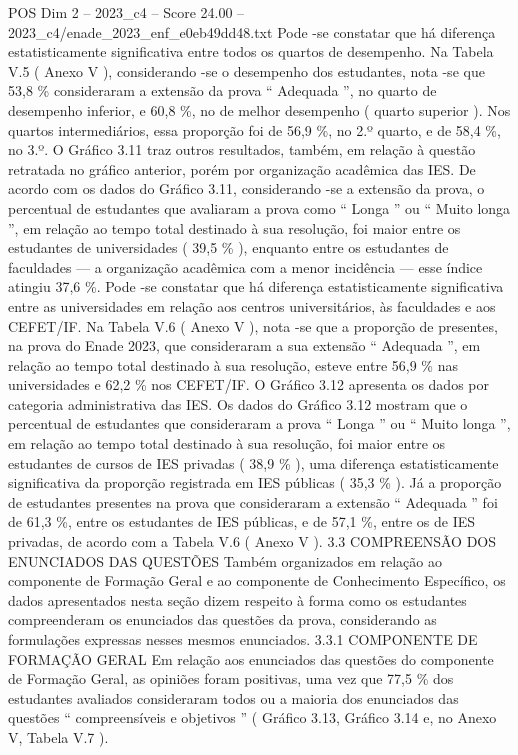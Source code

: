 \begin{textsample}{POS Dim 2 – 2023\_c4 – Score 24.00 – 2023\_c4/enade\_2023\_enf\_e0eb49dd48.txt}
Pode -se constatar que há diferença estatisticamente significativa entre todos os quartos de desempenho.
Na Tabela V.5 ( Anexo V ), considerando -se o desempenho dos estudantes, nota -se que 53,8 \% consideraram a extensão da prova “ Adequada ”, no quarto de desempenho inferior, e 60,8 \%, no de melhor desempenho ( quarto superior ).
Nos quartos intermediários, essa proporção foi de 56,9 \%, no 2.º quarto, e de 58,4 \%, no 3.º.
O Gráfico 3.11 traz outros resultados, também, em relação à questão retratada no gráfico anterior, porém por organização acadêmica das IES.
De acordo com os dados do Gráfico 3.11, considerando -se a extensão da prova, o percentual de estudantes que avaliaram a prova como “ Longa ” ou “ Muito longa ”, em relação ao tempo total destinado à sua resolução, foi maior entre os estudantes de universidades ( 39,5 \% ), enquanto entre os estudantes de faculdades — a organização acadêmica com a menor incidência — esse índice atingiu 37,6 \%.
Pode -se constatar que há diferença estatisticamente significativa entre as universidades em relação aos centros universitários, às faculdades e aos CEFET/IF.
Na Tabela V.6 ( Anexo V ), nota -se que a proporção de presentes, na prova do Enade 2023, que consideraram a sua extensão “ Adequada ”, em relação ao tempo total destinado à sua resolução, esteve entre 56,9 \% nas universidades e 62,2 \% nos CEFET/IF.
O Gráfico 3.12 apresenta os dados por categoria administrativa das IES.
Os dados do Gráfico 3.12 mostram que o percentual de estudantes que consideraram a prova “ Longa ” ou “ Muito longa ”, em relação ao tempo total destinado à sua resolução, foi maior entre os estudantes de cursos de IES privadas ( 38,9 \% ), uma diferença estatisticamente significativa da proporção registrada em IES públicas ( 35,3 \% ).
Já a proporção de estudantes presentes na prova que consideraram a extensão “ Adequada ” foi de 61,3 \%, entre os estudantes de IES públicas, e de 57,1 \%, entre os de IES privadas, de acordo com a Tabela V.6 ( Anexo V ). 3.3 COMPREENSÃO DOS ENUNCIADOS DAS QUESTÕES Também organizados em relação ao componente de Formação Geral e ao componente de Conhecimento Específico, os dados apresentados nesta seção dizem respeito à forma como os estudantes compreenderam os enunciados das questões da prova, considerando as formulações expressas nesses mesmos enunciados. 3.3.1 COMPONENTE DE FORMAÇÃO GERAL Em relação aos enunciados das questões do componente de Formação Geral, as opiniões foram positivas, uma vez que 77,5 \% dos estudantes avaliados consideraram todos ou a maioria dos enunciados das questões “ compreensíveis e objetivos ” ( Gráfico 3.13, Gráfico 3.14 e, no Anexo V, Tabela V.7 ).

\end{textsample}
